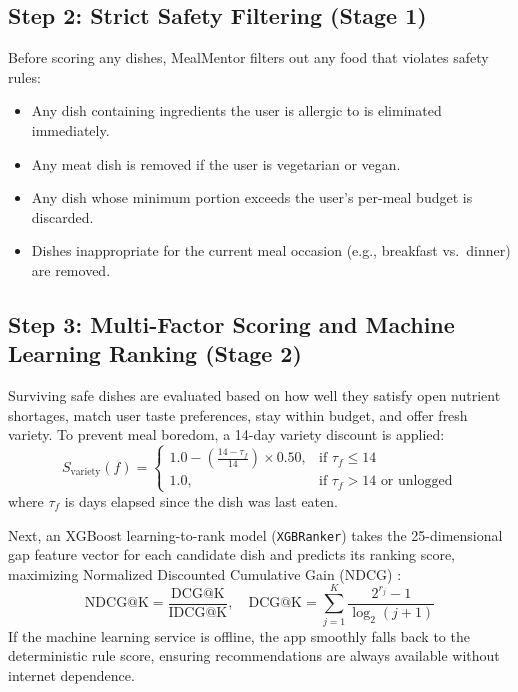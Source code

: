 \documentclass[10pt, conference, letterpaper]{IEEEtran}
\begin{document}
\subsection{Step 2: Strict Safety Filtering (Stage 1)}
Before scoring any dishes, MealMentor filters out any food that violates safety rules:
\begin{itemize}[leftmargin=*, nosep]
    \item Any dish containing ingredients the user is allergic to is eliminated immediately.
    \item Any meat dish is removed if the user is vegetarian or vegan.
    \item Any dish whose minimum portion exceeds the user's per-meal budget is discarded.
    \item Dishes inappropriate for the current meal occasion (e.g., breakfast vs.\ dinner) are removed.
\end{itemize}

\subsection{Step 3: Multi-Factor Scoring and Machine Learning Ranking (Stage 2)}
Surviving safe dishes are evaluated based on how well they satisfy open nutrient shortages, match user taste preferences, stay within budget, and offer fresh variety. To prevent meal boredom, a 14-day variety discount is applied:
\begin{equation}
S_{\text{variety}}(f) = 
\begin{cases} 
1.0 - \left(\frac{14 - \tau_f}{14}\right) \times 0.50, & \text{if } \tau_f \le 14 \\
1.0, & \text{if } \tau_f > 14 \text{ or unlogged}
\end{cases}
\label{eq:variety}
\end{equation}
where $\tau_f$ is days elapsed since the dish was last eaten.

Next, an XGBoost learning-to-rank model (\texttt{XGBRanker}) takes the 25-dimensional gap feature vector for each candidate dish and predicts its ranking score, maximizing Normalized Discounted Cumulative Gain (NDCG) \cite{chen2016, burges2005}:
\begin{equation}
\text{NDCG@K} = \frac{\text{DCG@K}}{\text{IDCG@K}}, \quad \text{DCG@K} = \sum_{j=1}^K \frac{2^{r_j} - 1}{\log_2(j + 1)}
\label{eq:ndcg}
\end{equation}
If the machine learning service is offline, the app smoothly falls back to the deterministic rule score, ensuring recommendations are always available without internet dependence.
\end{document}

